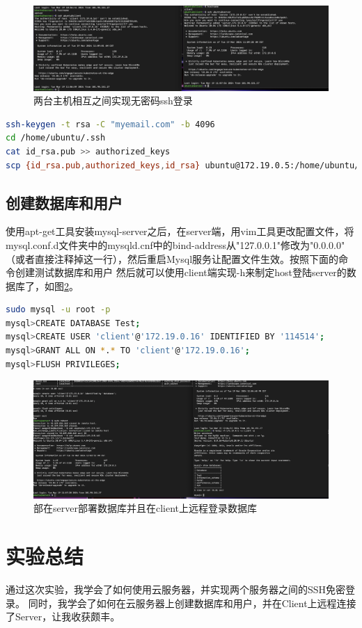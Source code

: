 \documentclass{ctexart}
\begin{document}
\begin{figure}
    \centering
    \includegraphics[width=1.0\textwidth]{no_pwd_login.png}
    \caption{两台主机相互之间实现无密码ssh登录}
    \label{fig:3}
\end{figure}
\begin{lstlisting}[language=bash]
ssh-keygen -t rsa -C "myemail.com" -b 4096
cd /home/ubuntu/.ssh
cat id_rsa.pub >> authorized_keys
scp {id_rsa.pub,authorized_keys,id_rsa} ubuntu@172.19.0.5:/home/ubuntu/.ssh
\end{lstlisting}
\subsection{创建数据库和用户}
使用apt-get工具安装mysql-server之后，在server端，用vim工具更改配置文件，将mysql.conf.d文件夹中的mysqld.cnf中的bind-address从"127.0.0.1"修改为"0.0.0.0"
（或者直接注释掉这一行），然后重启Mysql服务让配置文件生效。按照下面的命令创建测试数据库和用户
然后就可以使用client端实现-h来制定host登陆server的数据库了，如图\ref{fig:4}。
\begin{lstlisting}[language=bash]
sudo mysql -u root -p
mysql>CREATE DATABASE Test;
mysql>CREATE USER 'client'@'172.19.0.16' IDENTIFIED BY '114514';
mysql>GRANT ALL ON *.* TO 'client'@'172.19.0.16';
mysql>FLUSH PRIVILEGES;
\end{lstlisting}
\begin{figure}[H]
    \centering
    \includegraphics[width=1.0\textwidth]{deploy_mysql.png}
    \caption{部在server部署数据库并且在client上远程登录数据库}
    \label{fig:4}
\end{figure}
\section{实验总结}
\indent 通过这次实验，我学会了如何使用云服务器，并实现两个服务器之间的SSH免密登录。
同时，我学会了如何在云服务器上创建数据库和用户，并在Client上远程连接了Server，让我收获颇丰。
\end{document}
